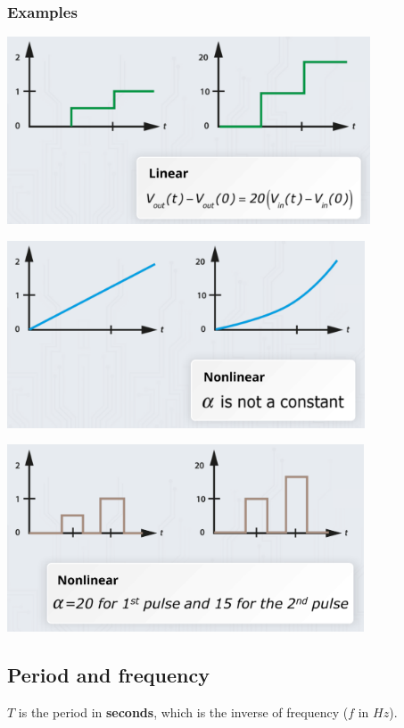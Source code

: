 \documentclass[11pt]{article}
\begin{document}
\subsubsection{Examples}
\label{sec:orgfc719d4}
\begin{center}
\includegraphics[height=15em]{./images/amplitude-linearity-stepwise-function.png}
\end{center}

\begin{center}
\includegraphics[height=15em]{./images/amplitude-nonlinearity-curve.png}
\end{center}

\begin{center}
\includegraphics[height=15em]{./images/amplitude-nonlinearity-pulse.png}
\end{center}
\subsection{Period and frequency}
\label{sec:orgfd4b011}
\(T\) is the period in \textbf{seconds}, which is the inverse of frequency (\(f\) in \(\unit{Hz}\)).
\end{document}
